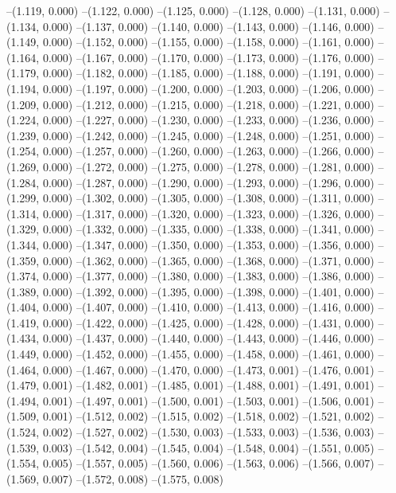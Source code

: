 {--(1.119, 0.000)
--(1.122, 0.000)
--(1.125, 0.000)
--(1.128, 0.000)
--(1.131, 0.000)
--(1.134, 0.000)
--(1.137, 0.000)
--(1.140, 0.000)
--(1.143, 0.000)
--(1.146, 0.000)
--(1.149, 0.000)
--(1.152, 0.000)
--(1.155, 0.000)
--(1.158, 0.000)
--(1.161, 0.000)
--(1.164, 0.000)
--(1.167, 0.000)
--(1.170, 0.000)
--(1.173, 0.000)
--(1.176, 0.000)
--(1.179, 0.000)
--(1.182, 0.000)
--(1.185, 0.000)
--(1.188, 0.000)
--(1.191, 0.000)
--(1.194, 0.000)
--(1.197, 0.000)
--(1.200, 0.000)
--(1.203, 0.000)
--(1.206, 0.000)
--(1.209, 0.000)
--(1.212, 0.000)
--(1.215, 0.000)
--(1.218, 0.000)
--(1.221, 0.000)
--(1.224, 0.000)
--(1.227, 0.000)
--(1.230, 0.000)
--(1.233, 0.000)
--(1.236, 0.000)
--(1.239, 0.000)
--(1.242, 0.000)
--(1.245, 0.000)
--(1.248, 0.000)
--(1.251, 0.000)
--(1.254, 0.000)
--(1.257, 0.000)
--(1.260, 0.000)
--(1.263, 0.000)
--(1.266, 0.000)
--(1.269, 0.000)
--(1.272, 0.000)
--(1.275, 0.000)
--(1.278, 0.000)
--(1.281, 0.000)
--(1.284, 0.000)
--(1.287, 0.000)
--(1.290, 0.000)
--(1.293, 0.000)
--(1.296, 0.000)
--(1.299, 0.000)
--(1.302, 0.000)
--(1.305, 0.000)
--(1.308, 0.000)
--(1.311, 0.000)
--(1.314, 0.000)
--(1.317, 0.000)
--(1.320, 0.000)
--(1.323, 0.000)
--(1.326, 0.000)
--(1.329, 0.000)
--(1.332, 0.000)
--(1.335, 0.000)
--(1.338, 0.000)
--(1.341, 0.000)
--(1.344, 0.000)
--(1.347, 0.000)
--(1.350, 0.000)
--(1.353, 0.000)
--(1.356, 0.000)
--(1.359, 0.000)
--(1.362, 0.000)
--(1.365, 0.000)
--(1.368, 0.000)
--(1.371, 0.000)
--(1.374, 0.000)
--(1.377, 0.000)
--(1.380, 0.000)
--(1.383, 0.000)
--(1.386, 0.000)
--(1.389, 0.000)
--(1.392, 0.000)
--(1.395, 0.000)
--(1.398, 0.000)
--(1.401, 0.000)
--(1.404, 0.000)
--(1.407, 0.000)
--(1.410, 0.000)
--(1.413, 0.000)
--(1.416, 0.000)
--(1.419, 0.000)
--(1.422, 0.000)
--(1.425, 0.000)
--(1.428, 0.000)
--(1.431, 0.000)
--(1.434, 0.000)
--(1.437, 0.000)
--(1.440, 0.000)
--(1.443, 0.000)
--(1.446, 0.000)
--(1.449, 0.000)
--(1.452, 0.000)
--(1.455, 0.000)
--(1.458, 0.000)
--(1.461, 0.000)
--(1.464, 0.000)
--(1.467, 0.000)
--(1.470, 0.000)
--(1.473, 0.001)
--(1.476, 0.001)
--(1.479, 0.001)
--(1.482, 0.001)
--(1.485, 0.001)
--(1.488, 0.001)
--(1.491, 0.001)
--(1.494, 0.001)
--(1.497, 0.001)
--(1.500, 0.001)
--(1.503, 0.001)
--(1.506, 0.001)
--(1.509, 0.001)
--(1.512, 0.002)
--(1.515, 0.002)
--(1.518, 0.002)
--(1.521, 0.002)
--(1.524, 0.002)
--(1.527, 0.002)
--(1.530, 0.003)
--(1.533, 0.003)
--(1.536, 0.003)
--(1.539, 0.003)
--(1.542, 0.004)
--(1.545, 0.004)
--(1.548, 0.004)
--(1.551, 0.005)
--(1.554, 0.005)
--(1.557, 0.005)
--(1.560, 0.006)
--(1.563, 0.006)
--(1.566, 0.007)
--(1.569, 0.007)
--(1.572, 0.008)
--(1.575, 0.008)
}
